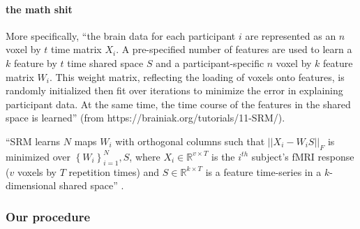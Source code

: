 \paragraph{the math shit}


%
More specifically, ``the brain data for each participant $i$ are represented as
an \textbf{$n$} voxel by $t$ time matrix  $X_{i}$. A pre-specified number of
features are used to learn a $k$ feature by  $t$ time shared space $S$ and a
participant-specific $n$ voxel by $k$  feature matrix $W_{i}$. This weight
matrix, reflecting the loading of voxels onto features, is randomly initialized
then fit over iterations to minimize the error in explaining participant data.
At the same time, the time course of the features in the shared space is
learned'' (from https://brainiak.org/tutorials/11-SRM/).

%
``SRM learns $N$ maps $W_{i}$ with orthogonal columns such that
$||X_{i}-W_{i}S||_{F}$ is minimized over $\left\{ W_{i}\right\} _{i=1}^{N},S$,
where $X_{i}\in\mathbb{R}^{v\times{T}}$ is the $i^{th}$ subject's fMRI response
($v$ voxels by $T$ repetition times) and $S\in\mathbb{R}^{k\times{T}}$ is a
feature time-series in a $k$-dimensional shared space''
\citep{vodrahalli2018mapping}.


\subsubsection{Our procedure}


